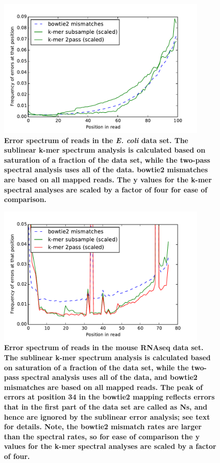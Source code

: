 \documentclass{article}
\begin{document}
\begin{figure}[!ht]
 \centerline{\includegraphics[width=4in]{./figures/ecoli-errhist}}
\caption{{\bf Error spectrum of reads in the {\em E. coli} data
    set. The sublinear k-mer spectrum analysis is calculated based on
    saturation of a fraction of the data set, while the two-pass
    spectral analysis uses all of the data.  bowtie2 mismatches are
    based on all mapped reads.  The y values for the k-mer spectral
    analyses are scaled by a factor of four for ease of comparison.}}
\label{fig:ecoli_err}
\end{figure}

\begin{figure}[!ht]
 \centerline{\includegraphics[width=4in]{./figures/rseq-errhist}}
\caption{{\bf Error spectrum of reads in the mouse RNAseq data set.
    The sublinear k-mer spectrum analysis is calculated based on
    saturation of a fraction of the data set, while the two-pass
    spectral analysis uses all of the data, and bowtie2 mismatches are
    based on all mapped reads.  The peak of errors at position 34 in
    the bowtie2 mapping reflects errors that in the first part of the
    data set are called as Ns, and hence are ignored by the sublinear
    error analysis; see text for details. Note, the bowtie2 mismatch
    rates are larger than the spectral rates, so for ease of
    comparison the y values for the k-mer spectral analyses are scaled
    by a factor of four.}}
\label{fig:rseq_err}
\end{figure}
\end{document}
